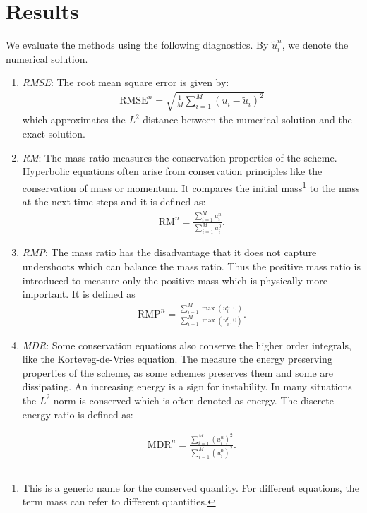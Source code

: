 \section{Results}
We evaluate the methods using the following diagnostics. By $\tilde{u}_i^n$, we denote the numerical
solution.
\begin{enumerate}
    \item \emph{RMSE}: The root mean square error is given by:
    \begin{align*}
        \mathrm{RMSE}^n = \sqrt{\frac{1}{M}\sum_{i=1}^M (u_i - \tilde u_i)^2}
    \end{align*}
    which approximates the $L^2$-distance between the numerical solution and the
    exact solution.

    \item \emph{RM}: The mass ratio measures the conservation properties of the scheme. Hyperbolic
    equations often arise from conservation principles like the conservation of mass or momentum. 
    It compares the initial mass\footnote{This is a generic name for the conserved quantity. For
    different equations, the term mass can refer to different quantities.} to the mass at the
    next time steps and it is defined as:
    \begin{align*}
        \mathrm{RM}^n = \frac{\sum_{i=1}^M u_i^n}{\sum_{i=1}^M u_i^0}.
    \end{align*}

    \item \emph{RMP}: The mass ratio has the disadvantage that it does not capture undershoots which can
    balance the mass ratio. Thus the positive mass ratio is introduced to measure only the positive mass
    which is physically more important. It is defined as
    \begin{align*}
        \mathrm{RMP}^n = \frac{\sum_{i=1}^M \max(u_i^n, 0)}{\sum_{i=1}^M \max(u_i^0, 0)}.
    \end{align*}

    \item \emph{MDR}: Some conservation equations also conserve the higher order integrals, like the
    Korteveg-de-Vries equation. The measure the energy preserving properties of the scheme, as some
    schemes preserves them and some are dissipating. An increasing energy is a sign for 
    instability. In many situations the $L^2$-norm is conserved which is often denoted as energy. The
    discrete energy ratio is defined as:
    
    \begin{align*}
        \mathrm{MDR}^n =\frac{\sum_{i=1}^M (u_i^n)^2}{\sum_{i=1}^M (u_i^0)^2}.
    \end{align*}


\end{enumerate}
